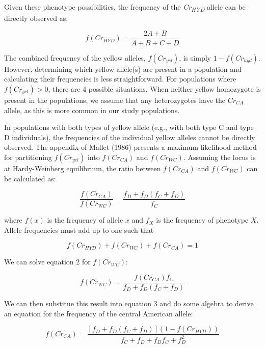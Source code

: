 \documentclass[]{article}
\begin{document}
Given these phenotype possibilities, the frequency of the
\textit{Cr\textsubscript{HYD}} allele can be directly observed as:

\begin{equation}
f(Cr_{HYD}) = \frac{2A + B}{A + B + C +D}
\end{equation}

The combined frequency of the yellow alleles, \(f(Cr_{yel})\), is simply
\(1 - f(Cr_{hyd})\). However, determining which yellow allele(s) are
present in a population and calculating their frequencies is less
straightforward. For populations where \(f(Cr_{yel}) > 0\), there are 4
possible situations. When neither yellow homozygote is present in the
populations, we assume that any heterozygotes have the \(Cr_{CA}\)
allele, as this is more common in our study populations.

In populations with both types of yellow allele (e.g., with both type C
and type D individuals), the frequencies of the individual yellow
alleles cannot be directly observed. The appendix of Mallet (1986)
presents a maximum likelihood method for partitioning \(f(Cr_{yel})\)
into \(f(Cr_{CA})\) and \(f(Cr_{WC})\). Assuming the locus is at
Hardy-Weinberg equilibrium, the ratio between \(f(Cr_{CA})\) and
\(f(Cr_{WC})\) can be calculated as:

\begin{equation}
\frac{f(Cr_{CA})}{f(Cr_{WC})}  =  \frac{f_{D}+f_{D}(f_{C}+f_{D})}{f_{C}}
\end{equation}

where \(f(x)\) is the frequency of allele \(x\) and \(f_{X}\) is the
frequency of phenotype \(X\). Allele frequencies must add up to one such
that

\begin{equation}
f(Cr_{HYD}) + f(Cr_{WC}) + f(Cr_{CA}) = 1
\end{equation}

We can solve equation 2 for \(f(Cr_{WC})\):

\begin{equation}
f(Cr_{WC}) = \frac{f(Cr_{CA})f_{C}}{f_{D}+f_{D}(f_{C}+f_{D})}
\end{equation}

We can then substitue this result into equation 3 and do some algebra to
derive an equation for the frequency of the central American allele:

\begin{equation}
f(Cr_{CA}) = \frac{[f_{D}+f_{D}(f_{C}+f_{D})](1-f(Cr_{HYD}))}{f_{C} + f_{D}+f_{D}f_{C}+f_{D}^{2}}
\end{equation}
\end{document}
